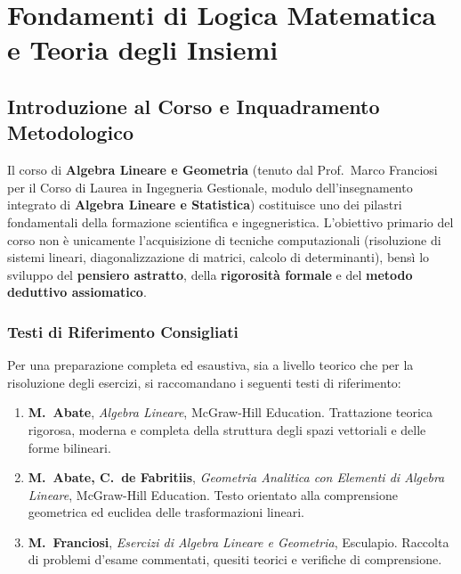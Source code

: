 
\chapter{Fondamenti di Logica Matematica e Teoria degli Insiemi}
\label{chap:fondamenti_logica_insiemistica}

\section{Introduzione al Corso e Inquadramento Metodologico}

Il corso di \textbf{Algebra Lineare e Geometria} (tenuto dal Prof.~Marco Franciosi per il Corso di Laurea in Ingegneria Gestionale, modulo dell'insegnamento integrato di \textbf{Algebra Lineare e Statistica}) costituisce uno dei pilastri fondamentali della formazione scientifica e ingegneristica. L'obiettivo primario del corso non è unicamente l'acquisizione di tecniche computazionali (risoluzione di sistemi lineari, diagonalizzazione di matrici, calcolo di determinanti), bensì lo sviluppo del \textbf{pensiero astratto}, della \textbf{rigorosità formale} e del \textbf{metodo deduttivo assiomatico}.

\subsection{Testi di Riferimento Consigliati}
Per una preparazione completa ed esaustiva, sia a livello teorico che per la risoluzione degli esercizi, si raccomandano i seguenti testi di riferimento:
\begin{enumerate}
    \item \textbf{M.~Abate}, \emph{Algebra Lineare}, McGraw-Hill Education. Trattazione teorica rigorosa, moderna e completa della struttura degli spazi vettoriali e delle forme bilineari.
    \item \textbf{M.~Abate, C.~de Fabritiis}, \emph{Geometria Analitica con Elementi di Algebra Lineare}, McGraw-Hill Education. Testo orientato alla comprensione geometrica ed euclidea delle trasformazioni lineari.
    \item \textbf{M.~Franciosi}, \emph{Esercizi di Algebra Lineare e Geometria}, Esculapio. Raccolta di problemi d'esame commentati, quesiti teorici e verifiche di comprensione.
\end{enumerate}

